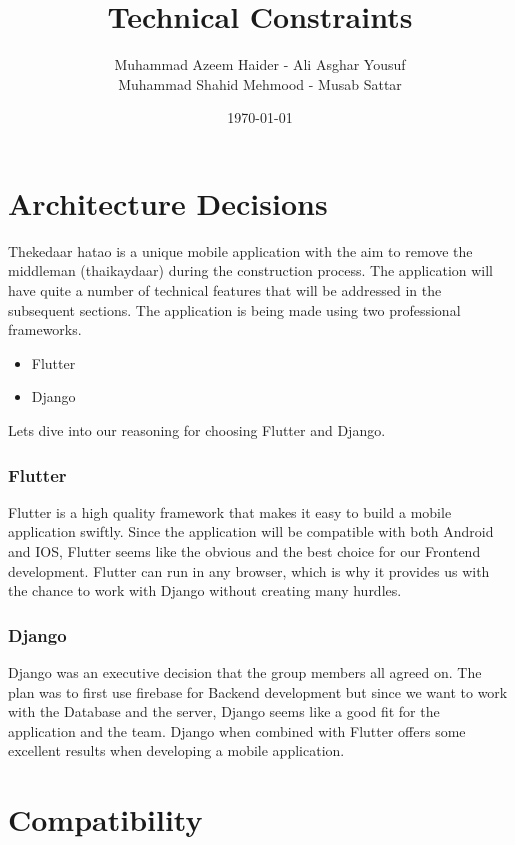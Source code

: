 \documentclass[12pt]{report}
\title{Technical Constraints}
\author{Muhammad Azeem Haider - Ali Asghar Yousuf \\
        Muhammad Shahid Mehmood - Musab Sattar}
\date{\today}
\begin{document}
\maketitle

\newpage

\section*{Architecture Decisions}

Thekedaar hatao is a unique mobile application with the aim to remove the middleman (thaikaydaar) during the construction process.
The application will have quite a number of technical features that will be addressed in the subsequent sections. The application is being made using two professional frameworks. 

\begin{itemize}

        \item Flutter 
        \item Django

\end{itemize}

Lets dive into our reasoning for choosing Flutter and Django. 

\subsubsection*{Flutter}

Flutter is a high quality framework that makes it easy to build a mobile application swiftly. Since the application will be compatible with both Android and IOS,
Flutter seems like the obvious and the best choice for our Frontend development. Flutter can run in any browser, which is why it provides us with the chance to work with Django without creating many hurdles.  

\subsubsection*{Django}

Django was an executive decision that the group members all agreed on. The plan was to first use firebase for Backend development but since we want to work with the Database and the server, 
Django seems like a good fit for the application and the team. Django when combined with Flutter offers some excellent results when developing a mobile application. 

\section*{Compatibility}
\end{document}
